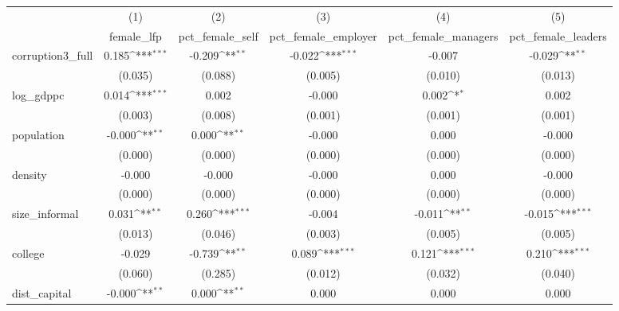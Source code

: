 {
\def\sym#1{\ifmmode^{#1}\else\(^{#1}\)\fi}
\begin{tabular}{l*{5}{c}}
\hline\hline
            &\multicolumn{1}{c}{(1)}&\multicolumn{1}{c}{(2)}&\multicolumn{1}{c}{(3)}&\multicolumn{1}{c}{(4)}&\multicolumn{1}{c}{(5)}\\
            &\multicolumn{1}{c}{female\_lfp}&\multicolumn{1}{c}{pct\_female\_self}&\multicolumn{1}{c}{pct\_female\_employer}&\multicolumn{1}{c}{pct\_female\_managers}&\multicolumn{1}{c}{pct\_female\_leaders}\\
\hline
corruption3\_full&       0.185\sym{***}&      -0.209\sym{**} &      -0.022\sym{***}&      -0.007         &      -0.029\sym{**} \\
            &     (0.035)         &     (0.088)         &     (0.005)         &     (0.010)         &     (0.013)         \\
[1em]
log\_gdppc   &       0.014\sym{***}&       0.002         &      -0.000         &       0.002\sym{*}  &       0.002         \\
            &     (0.003)         &     (0.008)         &     (0.001)         &     (0.001)         &     (0.001)         \\
[1em]
population  &      -0.000\sym{**} &       0.000\sym{**} &      -0.000         &       0.000         &      -0.000         \\
            &     (0.000)         &     (0.000)         &     (0.000)         &     (0.000)         &     (0.000)         \\
[1em]
density     &      -0.000         &      -0.000         &      -0.000         &       0.000         &      -0.000         \\
            &     (0.000)         &     (0.000)         &     (0.000)         &     (0.000)         &     (0.000)         \\
[1em]
size\_informal&       0.031\sym{**} &       0.260\sym{***}&      -0.004         &      -0.011\sym{**} &      -0.015\sym{***}\\
            &     (0.013)         &     (0.046)         &     (0.003)         &     (0.005)         &     (0.005)         \\
[1em]
college     &      -0.029         &      -0.739\sym{**} &       0.089\sym{***}&       0.121\sym{***}&       0.210\sym{***}\\
            &     (0.060)         &     (0.285)         &     (0.012)         &     (0.032)         &     (0.040)         \\
[1em]
dist\_capital&      -0.000\sym{**} &       0.000\sym{**} &       0.000         &       0.000         &       0.000         \\

\end{tabular}}

